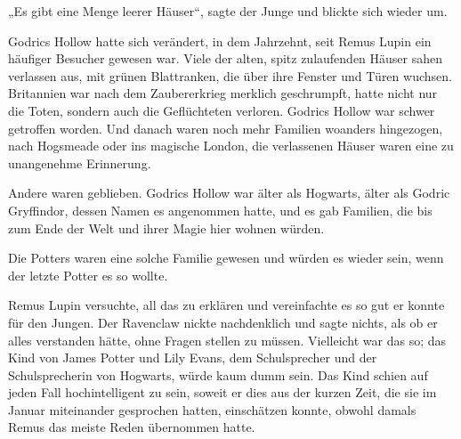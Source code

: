 „Es gibt eine Menge leerer Häuser“, sagte der Junge und blickte sich wieder um.

Godrics Hollow hatte sich verändert, in dem Jahrzehnt, seit Remus Lupin ein häufiger Besucher gewesen war. Viele der alten, spitz zulaufenden Häuser sahen verlassen aus, mit grünen Blattranken, die über ihre Fenster und Türen wuchsen. Britannien war nach dem Zaubererkrieg merklich geschrumpft, hatte nicht nur die Toten, sondern auch die Geflüchteten verloren. Godrics Hollow war schwer getroffen worden. Und danach waren noch mehr Familien woanders hingezogen, nach Hogsmeade oder ins magische London, die verlassenen Häuser waren eine zu unangenehme Erinnerung.

Andere waren geblieben. Godrics Hollow war älter als Hogwarts, älter als Godric Gryffindor, dessen Namen es angenommen hatte, und es gab Familien, die bis zum Ende der Welt und ihrer Magie hier wohnen würden.

Die Potters waren eine solche Familie gewesen und würden es wieder sein, wenn der letzte Potter es so wollte.

Remus Lupin versuchte, all das zu erklären und vereinfachte es so gut er konnte für den Jungen. Der Ravenclaw nickte nachdenklich und sagte nichts, als ob er alles verstanden hätte, ohne Fragen stellen zu müssen. Vielleicht war das so; das Kind von James Potter und Lily Evans, dem Schulsprecher und der Schulsprecherin von Hogwarts, würde kaum dumm sein. Das Kind schien auf jeden Fall hochintelligent zu sein, soweit er dies aus der kurzen Zeit, die sie im Januar miteinander gesprochen hatten, einschätzen konnte, obwohl damals Remus das meiste Reden übernommen hatte.

